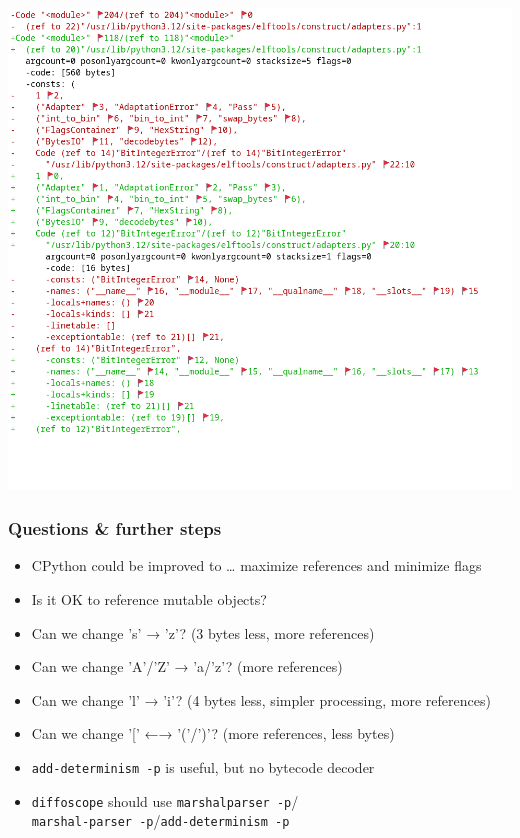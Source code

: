 \documentclass[]{beamer}
\begin{document}
\begin{frame}
  \includegraphics[width=\textwidth]{images/pyc-diff.png}
\end{frame}

\begin{frame}
  \frametitle{Questions \& further steps}

  \begin{itemize}
    \pause
  \item CPython could be improved to … maximize references and minimize flags
    \pause
  \item Is it OK to reference mutable objects?
    \pause
  \item Can we change 's' → 'z'? (3 bytes less, more references)
    \pause
  \item Can we change 'A'/'Z' → 'a/'z'? (more references)
    \pause
  \item Can we change 'l' → 'i'? (4 bytes less, simpler processing, more references)
    \pause
  \item Can we change '[' ←→ '('/')'? (more references, less bytes)
  \end{itemize}

  \begin{itemize}
    \pause
  \item \texttt{add-determinism -p} is useful\pause, but no bytecode decoder
    \pause
  \item \texttt{diffoscope} should use \texttt{marshalparser -p}/\\
      \texttt{marshal-parser -p}/\texttt{add-determinism -p}
  \end{itemize}
\end{frame}
\end{document}
